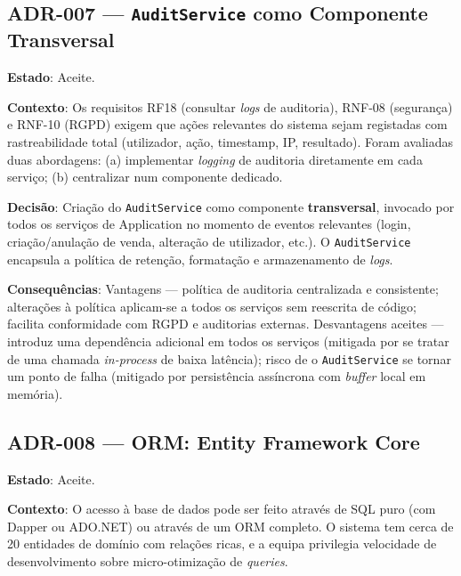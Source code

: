 \subsection*{ADR-007 --- \texttt{AuditService} como Componente Transversal}

\noindent\textbf{Estado}: Aceite.

\noindent\textbf{Contexto}: Os requisitos RF18 (consultar \textit{logs} de auditoria), RNF-08 (segurança) e RNF-10 (RGPD) exigem que ações relevantes do sistema sejam registadas com rastreabilidade total (utilizador, ação, timestamp, IP, resultado). Foram avaliadas duas abordagens: (a) implementar \textit{logging} de auditoria diretamente em cada serviço; (b) centralizar num componente dedicado.

\noindent\textbf{Decisão}: Criação do \texttt{AuditService} como componente \textbf{transversal}, invocado por todos os serviços de Application no momento de eventos relevantes (login, criação/anulação de venda, alteração de utilizador, etc.). O \texttt{AuditService} encapsula a política de retenção, formatação e armazenamento de \textit{logs}.

\noindent\textbf{Consequências}: Vantagens --- política de auditoria centralizada e consistente; alterações à política aplicam-se a todos os serviços sem reescrita de código; facilita conformidade com RGPD e auditorias externas. Desvantagens aceites --- introduz uma dependência adicional em todos os serviços (mitigada por se tratar de uma chamada \textit{in-process} de baixa latência); risco de o \texttt{AuditService} se tornar um ponto de falha (mitigado por persistência assíncrona com \textit{buffer} local em memória).

\subsection*{ADR-008 --- ORM: Entity Framework Core}

\noindent\textbf{Estado}: Aceite.

\noindent\textbf{Contexto}: O acesso à base de dados pode ser feito através de SQL puro (com Dapper ou ADO.NET) ou através de um ORM completo. O sistema tem cerca de 20 entidades de domínio com relações ricas, e a equipa privilegia velocidade de desenvolvimento sobre micro-otimização de \textit{queries}.

